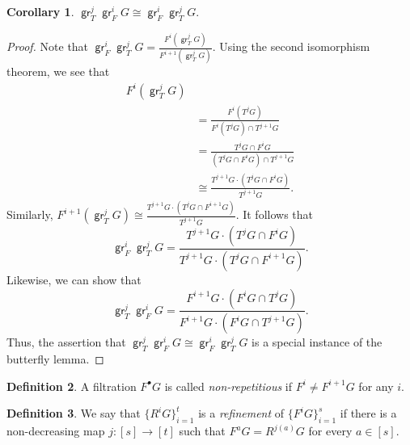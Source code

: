 \documentclass[10pt,letterpaper,cm]{nupset}
\theoremstyle{definition}
\newtheorem{definition}{Definition}[subsection]
\theoremstyle{theorem}
\newtheorem{corollary}[definition]{Corollary}
\theoremstyle{remark}
\newcommand{\1}{\mathbf{1}}
\newcommand{\0}{\vec 0}
\DeclareMathOperator{\gr}{\mathsf{gr}}
\begin{document}
\begin{corollary}
$\gr_T^j\gr_F^i{G} \cong \gr_F^i \gr_T^j{G}$.
\end{corollary}
\begin{proof}
Note that $\gr_F^i \gr_T^j{G} = \frac{F^i(\gr_T^j{G})}{F^{i+1}(\gr_T^j{G})}$. 
Using the second isomorphism theorem, we see that 
\begin{align*}
F^i(\gr_T^j{G}) \\ & = \frac{F^i(T^j{G})}{F^i(T^j{G}) \cap T^{j+1}{G}} 
\\ & = \frac{T^j{G} \cap F^i{G}}{(T^j{G} \cap F^i{G}) \cap T^{j+1}{G}} 
\\ & \cong \frac{T^{j+1}{G} \cdot (T^j{G} \cap F^i{G})}{T^{j+1}{G}} .
\end{align*} 
Similarly, $F^{i+1}(\gr_T^j{G}) \cong \frac{T^{j+1}{G} \cdot (T^j{G} \cap F^{i+1}{G})}{T^{j+1}{G}}.$ 
It follows that $$\gr_F^i \gr_T^j{G} = \frac{T^{j+1}{G} \cdot (T^j{G} \cap F^{i}{G})}{T^{j+1}{G} \cdot (T^j{G} \cap F^{i+1}{G})}.$$
Likewise, we can show that
$$\gr_T^j \gr_F^i{G} = \frac{F^{i+1}{G} \cdot (F^i{G} \cap T^{j}{G})}{F^{i+1}{G} \cdot (F^i{G} \cap T^{j+1}{G})}.$$ Thus, the assertion that $\gr_T^j\gr_F^i{G} \cong \gr_F^i \gr_T^j{G}$ is a special instance of the butterfly lemma. 
\end{proof}

\begin{definition}
A filtration $F^{\bullet}G$ is called \textit{non-repetitious} if $F^i \ne F^{i+1}G$ for any $i$. 
\end{definition}

\begin{definition}
We say that $\{R^iG\}_{i=1}^t$ is a \textit{refinement} of $\{F^iG\}_{i=1}^s$ if there is a non-decreasing map $j : [s] \to [t]$ such that $F^aG = R^{j(a)}G $ for every $a \in [s]$.
\end{definition}
\end{document}
